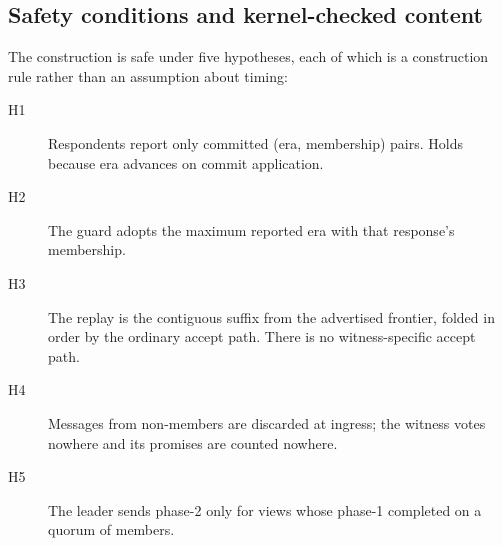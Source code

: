 \subsection{Safety conditions and kernel-checked content}
The construction is safe under five hypotheses, each of which is a
construction rule rather than an assumption about timing:
\begin{description}
\item[H1] Respondents report only committed (era, membership) pairs.
  Holds because era advances on commit application.
\item[H2] The guard adopts the maximum reported era with that response's
  membership.
\item[H3] The replay is the contiguous suffix from the advertised frontier,
  folded in order by the ordinary accept path. There is no
  witness-specific accept path.
\item[H4] Messages from non-members are discarded at ingress; the witness
  votes nowhere and its promises are counted nowhere.
\item[H5] The leader sends phase-2 only for views whose phase-1 completed
  on a quorum of members.
\end{description}

